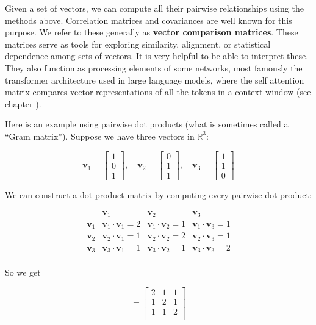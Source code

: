 Given a set of vectors, we can compute all their pairwise relationships using the methods above. Correlation matrices and covariances are well known for this purpose. We refer to these generally as \textbf{vector comparison matrices}. These matrices serve as  tools for exploring similarity, alignment, or statistical dependence among sets of vectors.  It is very helpful to be able to interpret these. They also function as processing elements of some networks, most famously the transformer architecture used in large language models, where the self attention matrix compares vector representations of all the tokens in a context window (see chapter ).  

Here is an example using pairwise dot products (what is sometimes called a ``Gram matrix''). Suppose we have three vectors in \( \mathbb{R}^3 \):

\[
\mathbf{v}_1 = 
\begin{bmatrix}
1 \\
0 \\
1
\end{bmatrix}, \quad
\mathbf{v}_2 = 
\begin{bmatrix}
0 \\
1 \\
1
\end{bmatrix}, \quad
\mathbf{v}_3 = 
\begin{bmatrix}
1 \\
1 \\
0
\end{bmatrix}
\]

We can construct a dot product matrix by computing every pairwise dot product:

\[
\begin{array}{c|ccc}
 & \mathbf{v}_1 & \mathbf{v}_2 & \mathbf{v}_3 \\
\hline
\mathbf{v}_1 & \mathbf{v}_1 \cdot \mathbf{v}_1 = 2 & \mathbf{v}_1 \cdot \mathbf{v}_2 = 1 & \mathbf{v}_1 \cdot \mathbf{v}_3 = 1 \\
\mathbf{v}_2 & \mathbf{v}_2 \cdot \mathbf{v}_1 = 1 & \mathbf{v}_2 \cdot \mathbf{v}_2 = 2 & \mathbf{v}_2 \cdot \mathbf{v}_3 = 1 \\
\mathbf{v}_3 & \mathbf{v}_3 \cdot \mathbf{v}_1 = 1 & \mathbf{v}_3 \cdot \mathbf{v}_2 = 1 & \mathbf{v}_3 \cdot \mathbf{v}_3 = 2 \\
\end{array}
\]

So we get

\[
=
\begin{bmatrix}
2 & 1 & 1 \\
1 & 2 & 1 \\
1 & 1 & 2 \\
\end{bmatrix}
\]

